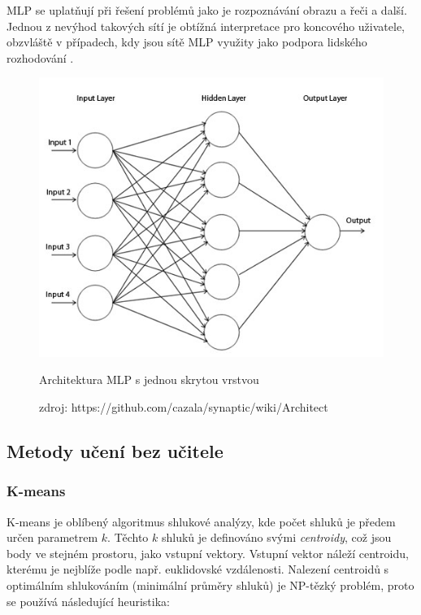 \documentclass[thesis=M,czech]{FITthesis}[2012/06/26]
\begin{document}
MLP se uplatňují při řešení problémů jako je rozpoznávání obrazu a řeči a další. Jednou z nevýhod takových sítí je obtížná interpretace pro koncového uživatele, obzvláště v případech, kdy jsou sítě MLP využity jako podpora lidského rozhodování \cite{needed}. 



\begin{figure}[htbp]
\begin{center}
	\includegraphics[scale=0.4]{mlp.jpeg}
\caption{Architektura MLP s jednou skrytou vrstvou}
\label{fig:mlp}
\end{center}
  \caption*{zdroj: https://github.com/cazala/synaptic/wiki/Architect}
\end{figure}

 
 \subsection{Metody učení bez učitele}

  \subsubsection*{K-means}

K-means je oblíbený algoritmus shlukové analýzy, kde počet shluků je předem určen parametrem $k$. Těchto $k$ shluků je definováno svými \textit{centroidy}, což jsou body ve stejném prostoru, jako vstupní vektory. Vstupní vektor náleží centroidu, kterému je nejblíže podle např. euklidovské vzdálenosti. Nalezení centroidů s optimálním shlukováním (minimální průměry shluků) je NP-tězký problém\cite{k-means-nphard}, proto se  používá následující heuristika\cite{k-means-algo}:
\end{document}

